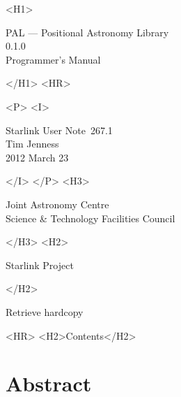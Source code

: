 \documentclass[twoside,11pt]{article}
\newcommand{\stardoccategory}  {Starlink User Note}
\newcommand{\stardocsource}    {sun\stardocnumber}
\newcommand{\stardocnumber}    {267.1}
\newcommand{\stardocauthors}   {Tim Jenness}
\newcommand{\stardocdate}      {2012 March 23}
\newcommand{\stardoctitle}     {PAL --- Positional Astronomy Library}
\newcommand{\stardocversion}   {0.1.0}
\newcommand{\stardocmanual}    {Programmer's Manual}
\newcommand{\htmladdnormallink}[2]{#1}
\newcommand{\htmladdimg}[1]{}
\newcommand{\htmlref}[2]{#1}
\newcommand{\htmladdtonavigation}[1]{}
\newcommand{\xlabel}[1]{}
\renewcommand{\_}{\texttt{\symbol{95}}}
\begin{document}
\begin{htmlonly}
   \xlabel{}
   \begin{rawhtml} <H1> \end{rawhtml}
      \stardoctitle\\
      \stardocversion\\
      \stardocmanual
   \begin{rawhtml} </H1> <HR> \end{rawhtml}


   \begin{rawhtml} <P> <I> \end{rawhtml}
   \stardoccategory\ \stardocnumber \\
   \stardocauthors \\
   \stardocdate
   \begin{rawhtml} </I> </P> <H3> \end{rawhtml}
      \htmladdnormallink{Joint Astronomy Centre}
                        {http://www.jach.hawaii.edu} \\
      \htmladdnormallink{Science \& Technology Facilities Council}
                        {http://www.scitech.ac.uk} \\
   \begin{rawhtml} </H3> <H2> \end{rawhtml}
      \htmladdnormallink{Starlink Project}{http://www.starlink.ac.uk/}
   \begin{rawhtml} </H2> \end{rawhtml}
   \htmladdnormallink{\htmladdimg{source.gif} Retrieve hardcopy}
      {http://www.starlink.ac.uk/cgi-bin/hcserver?\stardocsource}\\

  \label{stardoccontents}
  \begin{rawhtml} 
    <HR>
    <H2>Contents</H2>
  \end{rawhtml}
  \htmladdtonavigation{\htmlref{\htmladdimg{contents_motif.gif}}
        {stardoccontents}}

  \section{\xlabel{abstract}Abstract}
\end{htmlonly}
\end{document}

